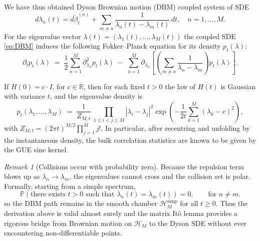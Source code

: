 \documentclass[12pt,reqno]{amsart}
\theoremstyle{plain}
\theoremstyle{definition}
\theoremstyle{remark}
\newtheorem{rem}{Remark}[section]       %
\begin{document}
We have thus obtained Dyson Brownian motion (DBM) coupled system of SDE
\begin{equation}
\label{eq:DBM}
  d\lambda_n(t)
   = d\widetilde{\beta}^{(n)}_t
    + \sum_{m\neq n}
        \frac{1}{\lambda_n(t)-\lambda_m(t)}\,dt,
  \quad n=1,\dots,M.
\end{equation}
For the eigenvalue vector 
\(\lambda(t)=(\lambda_1(t),\dots,\lambda_M(t))\)
the coupled SDE \eqref{eq:DBM} induces the following Fokker–Planck equation for its density
\(p_t(\lambda)\):
\begin{equation}
\partial_t p_t(\lambda)
  \;=\;\frac{1}{2}\sum_{n=1}^M\partial_{\lambda_n}^2 p_t(\lambda)
  \;-\;\sum_{n=1}^M \partial_{\lambda_n}
        \!\left[\left(\sum_{m\ne n}\frac{1}{\lambda_n-\lambda_m}\right)
              p_t(\lambda)\right].
\end{equation}

 If \(H(0)= c \cdot I\), for $c \in \mathbb{R}$, then for each fixed \(t>0\) the law of \(H(t)\) is Gaussian with variance \(t\), and the eigenvalue density is
\begin{equation}
\label{eq:pt-GUE}
p_t(\lambda_1,\ldots,\lambda_M)
 \;=\; \frac{1}{Z_{M,t}}\,
       \prod_{1\le i<j\le M}|\lambda_i-\lambda_j|^{2}
       \exp\!\left(-\frac{1}{2t}\sum_{k=1}^M(\lambda_k-c)^{2}\right),
\end{equation}
with \(Z_{M,t}=(2\pi t)^{M/2}\prod_{j=1}^M j!\).
In particular, after recentring and unfolding by the instantaneous density, the bulk correlation statistics are known to be given by the GUE sine kernel. 


\begin{rem}[Collisions occur with probability zero] \label{rem:2}
Because the repulsion term blows up as
\(\lambda_n\to\lambda_m\), the eigenvalues cannot cross and the collision set is polar.
Formally, starting from a simple spectrum,
\begin{equation}
\mathbb{P}\left(
  \text{there exists } t > 0 \text{ such that } \lambda_n(t) = \lambda_m(t)
\right) = 0, 
\qquad \text{for } n \ne m.
\end{equation}
so the DBM path remains in the smooth chamber \(\mathcal H_M^{\mathrm{simp}}\) for all \(t\ge0\).
Thus the derivation above is valid almost surely and the matrix Itô
lemma provides a rigorous bridge from Brownian motion on
\(\mathcal H_M\) to the Dyson SDE without ever encountering
non-differentiable points.
\end{rem}
\end{document}
